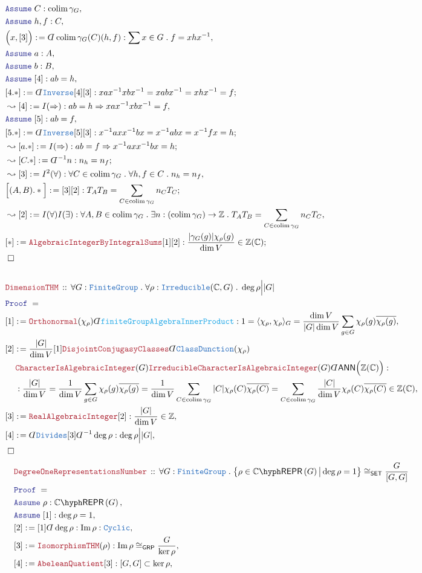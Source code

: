 \documentclass[12pt]{scrartcl}%
\newcommand{\TYPE}[1]{\textcolor{NavyBlue}{\mathtt{#1}}}%
\newcommand{\FUNC}[1]{\textcolor{Cerulean}{\mathtt{#1}}}%
\newcommand{\LOGIC}[1]{\textcolor{Blue}{\mathtt{#1}}}%
\newcommand{\THM}[1]{\textcolor{Maroon}{\mathtt{#1}}}%
\renewcommand{\.}{\; . \;} %
\newcommand{\de}{: \kern 0.1pc =} %
\newcommand{\Theorem}[2]{& \THM{#1} \, :: \, #2 \\ & \Proof = \\ } %
\newcommand{\NewLine}{\\ & \kern 1pc}%
\newcommand{\Page}[1]{ \begin{align*} #1 \end{align*}  }%
\newcommand{ \bd }{ \ByDef }%
\newcommand{\Imply}{\Rightarrow}
\newcommand{\Int}{\mathbb{Z}}%
\newcommand{\Complex}{\mathbb{C}}%
\DeclareMathOperator*{\im}{Im}%
\newcommand{\Say}[3]{& #1 \de #2 : #3, \\} %
\newcommand{\Conclude}[3]{& #1 \de #2 : #3; \\}%
\newcommand{\Derive}[3]{& \leadsto #1 \de #2 : #3, \\} %
\newcommand{\DeriveConclude}[3]{& \leadsto #1 \de #2 : #3 ; \\} %
\newcommand{\Assume}[2]{& \LOGIC{Assume} \; #1 : #2, \\} %
\newcommand{\QED}{\; \square} %
\newcommand{\EndProof}{& \QED \\} %
\newcommand{\ByDef}{\rotatebox[origin=c]{-180}{$D$}}%
\newcommand{\Proof}{\LOGIC{Proof} \; } %
\DeclareMathOperator*{\colim}{colim}%
\newcommand{\SET}{\mathsf{SET}} %
\newcommand{\FG}{\TYPE{FiniteGroup}} %
\newcommand{\GRP}{\mathsf{GRP}} %
\newcommand{\REPR}[2]{#1\hyph\mathsf{REPR}\left(#2\right)}
\newcommand{\ANN}{\mathsf{ANN}} %
\begin{document}
\Page{
	\Assume{C}{\colim \gamma_G}
	\Assume{h,f}{C}
	\Say{\Big(x,[3]\Big)}{\bd \colim \gamma_G (C)(h,f)}{\sum x \in G \. f = xhx^{-1} }
	\Assume{a}{A}
	\Assume{b}{B}
	\Assume{[4]}{ab = h}
	\Conclude{[4.*]}{\bd \TYPE{Inverse}[4][3]}{xax^{-1}xbx^{-1} = xabx^{-1} = xhx^{-1} = f}
	\Derive{[4]}{I(\Imply)}{ab = h \Imply xax^{-1}xbx^{-1} = f}  
	\Assume{[5]}{ab = f}
	\Conclude{[5.*]}{\bd \TYPE{Inverse}[5][3]}{x^{-1}axx^{-1}bx = x^{-1}abx = x^{-1}fx = h}
	\DeriveConclude{[a.*]}{I(\Imply)}{ab = f \Imply x^{-1}axx^{-1}bx = h}  
	\DeriveConclude{[C.*]}{\bd^{-1} n}{ n_h = n_f}
	\Derive{[3]}{I^2(\forall)}{ \forall C \in \colim \gamma_G \. \forall h,f \in C \. n_h = n_f  }
	\Conclude{\Big[(A,B).*\Big]}{[3][2]}{ T_AT_B = \sum_{C \in \colim \gamma_G} n_C T_C}
	\Derive{[2]}{I(\forall)I(\exists)}
	{
		\forall A,B \in \colim \gamma_G \. 
		\exists n : (\colim \gamma_G) \to \Int \.
		T_AT_B = \sum_{C \in \colim \gamma_G} n_C T_C
	}
	\Conclude{[*]}{\THM{AlgebraicIntegerByIntegralSums}[1][2]}{\frac{|\gamma_G(g)|\chi_\rho(g)}{\dim V} \in \Int(\Complex)}
	\EndProof
	\\
	\Theorem{DimensionTHM}
	{
		\forall G : \FG \.
		\forall \rho : \TYPE{Irreducible}(\Complex, G) \.
		\deg \rho \Big| |G|
	}
	\Say{[1]}{\THM{Orthonormal}(\chi_\rho)\bd \FUNC{finiteGroupAlgebraInnerProduct}}{
		1 = 
		\langle \chi_\rho,\chi_\rho \rangle_G =
		\frac{\dim V}{|G|\dim V} \sum_{g \in G} \chi_\rho(g) \overline{\chi_\rho(g)}	
	}
	\Say{[2]}{ 
		\frac{|G|}{\dim V} [1] 
		\THM{DisjointConjugasyClasses} \bd \TYPE{ClassDunction}(\chi_\rho)
		\NewLine 
		\THM{CharacterIsAlgebraicInteger}(G)
		\THM{IrreducibleCharacterIsAlgebraicInteger}(G)
		\bd \ANN \Big(\Int(\Complex)\Big)
	}
	{
		\NewLine : 
		\frac{|G|}{\dim V} =
		\frac{1}{\dim V} \sum_{g \in G} \chi_\rho(g) \overline{\chi_\rho(g)}  = 
		\frac{1}{\dim V} \sum_{C \in \colim \gamma_G} |C| \chi_\rho(C) \overline{\chi_\rho(C)} =
		\sum_{C \in \colim \gamma_G} \frac{|C|}{\dim V} \chi_\rho(C) \overline{\chi_\rho(C)} 
		\in \Int(\Complex)
	}
	\Say{[3]}{\THM{RealAlgebraicInteger}[2]}
	{
		\frac{|G|}{\dim V} \in \Int
	}
	\Say{[4]}{\bd \TYPE{Divides} [3]\bd^{-1} \deg \rho}{\deg \rho \Big| |G|}
	\EndProof
}\Page{
	\Theorem{DegreeOneRepresentationsNumber}
	{
		\forall G : \FG \.
		\big\{ \rho \in \REPR{\Complex}{G} \big| \deg \rho = 1 \big\} 
		\cong_{\SET} \frac{G}{[G,G]} 
	}
	\Assume{\rho}{\REPR{\Complex}{G}}
	\Assume{[1]}{\deg \rho = 1}
	\Say{[2]}{[1]\bd \deg \rho}{ \im \rho : \TYPE{Cyclic} }
	\Say{[3]}{\THM{IsomorphismTHM}(\rho)}{\im \rho \cong_{\GRP} \frac{G}{\ker \rho} }
	\Say{[4]}{\THM{AbeleanQuatient}[3]}{   [G,G] \subset \ker \rho  }
}
\end{document}
